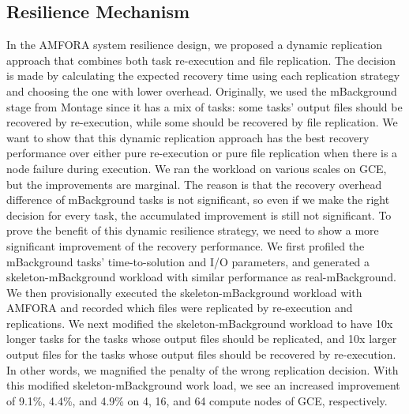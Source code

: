 \documentclass[preprint,12pt]{elsarticle}
\newcommand{\katznote}[1]{ {\textcolor{blue}    { ***Dan:   #1 }}}
\newcommand{\zhaonote}[1]{{\textcolor{darkgreen}{ ***Zhao:  #1 }}}
\newcommand{\katznote}[1]{}
\newcommand{\zhaonote}[1]{}
\begin{document}
\subsection{Resilience Mechanism}
In the AMFORA system resilience design, we proposed a dynamic replication approach that combines both task re-execution and file replication. 
The decision is made by calculating the expected recovery time using each replication strategy and choosing the one with lower overhead.
Originally, we used the mBackground stage from Montage since it has a mix of tasks: some tasks' output files should be recovered by re-execution, while
some should be recovered by file replication. 
We want to show that this dynamic replication approach has the best recovery performance over either pure re-execution or pure file replication when there
is a node failure during execution.
We ran the workload on various scales on GCE, but the improvements are marginal. 
The reason is that the recovery overhead difference of mBackground tasks is not significant, so even if we make the right decision for every task, the accumulated
improvement is still not significant.
To prove the benefit of this dynamic resilience strategy, we need to show  a more significant improvement of the recovery performance. We first profiled the mBackground tasks' time-to-solution and I/O parameters, and generated a skeleton-mBackground workload with similar performance as real-mBackground. We then provisionally executed the skeleton-mBackground workload with AMFORA and recorded which files were replicated by re-execution and replications.
We next modified the skeleton-mBackground workload to have 10x longer tasks for the tasks whose output files
should be replicated, and 10x larger output files for the tasks whose output files should be recovered by re-execution. 
In other words, we magnified the penalty of the wrong replication decision.
With this modified skeleton-mBackground work load, we see an increased improvement of 9.1\%, 4.4\%, and 4.9\% on 4, 16, and 64 compute nodes of GCE, respectively.
\end{document}

